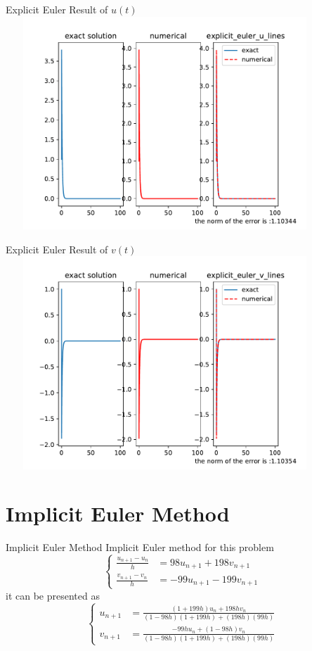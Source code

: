 \documentclass{beamer}
\begin{document}
 \begin{frame}{Explicit Euler Result of $u(t)$}
    \centering
    \includegraphics[height=8cm,width=12cm]{explicit_euler_u_lines.pdf}
 \end{frame}

 \begin{frame}{Explicit Euler Result of $v(t)$}
    \centering
    \includegraphics[height=8cm,width=12cm]{explicit_euler_v_lines.pdf}
 \end{frame}

 

 \section{Implicit Euler Method}
 \begin{frame}{Implicit Euler Method}
    Implicit Euler method for this problem
    \[
        \begin{cases}
        \frac{u_{n+1}-u_n}{h} &= 98u_{n+1}+198v_{n+1}\\
        \frac{v_{n+1}-v_n}{h} &= -99u_{n+1}-199v_{n+1}
        \end{cases}
    \]
    it can be presented as 
    \[
        \begin{cases}
        u_{n+1} &= \frac{(1+199h)u_n+198 h v_n}{(1-98h)(1+199h)+(198h)(99h)}\\
        v_{n+1} &= \frac{-99hu_n+(1-98h)v_n}{(1-98h)(1+199h)+(198h)(99h)}
        \end{cases}
    \]
    \end{frame}
\end{document}
